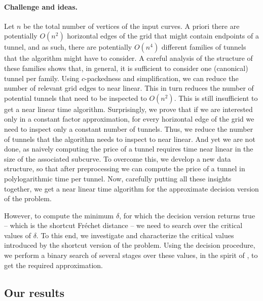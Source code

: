 \documentclass[12pt]{article}
\newcommand{\Frechet}{Fr\'{e}c{h}e{}t\xspace}\providecommand{\Arr}{\mathop{\mathrm{\EuScript{A}}}}
\newcommand{\tunnel}{tunnel\xspace}
\newcommand{\tunnels}{tunnels\xspace}
\numberwithin{figure}{section}
\numberwithin{equation}{section}
\begin{document}
\paragraph{Challenge and ideas.}
Let $n$ be the total number of vertices of the input curves. A priori
there are potentially $O(n^2)$ horizontal edges of the grid that might
contain endpoints of a \tunnel, and as such, there are potentially
$O(n^4)$ different families of \tunnels that the algorithm might have
to consider.  A careful analysis of the structure of these families
shows that, in general, it is sufficient to consider one (canonical)
\tunnel per family.  Using $c$-packedness and simplification, we can
reduce the number of relevant grid edges to near linear.  This in turn
reduces the number of potential \tunnels that need to be inspected to
$O(n^2)$.  This is still insufficient to get a near linear time
algorithm. Surprisingly, we prove that if we are interested only in a
constant factor approximation, for every horizontal edge of the grid
we need to inspect only a constant number of \tunnels.  Thus, we
reduce the number of \tunnels that the algorithm needs to inspect to
near linear. And yet we are not done, as naively computing the price
of a \tunnel requires time near linear in the size of the associated
subcurve.  To overcome this, we develop a new data structure, so that
after preprocessing we can compute the price of a \tunnel in
polylogarithmic time per \tunnel. Now, carefully putting all these
insights together, we get a near linear time algorithm for the
approximate decision version of the problem.

However, to compute the minimum $\delta$, for which the decision
version returns true -- which is the shortcut \Frechet distance -- we
need to search over the critical values of $\delta$. To this end, we
investigate and characterize the critical values introduced by the
shortcut version of the problem.  Using the decision procedure, we
perform a binary search of several stages over these values, in the
spirit of \cite{dhw-afdrc-12}, to get the required approximation.


\subsection*{Our results}
\end{document}
